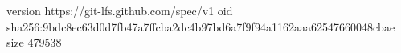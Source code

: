 version https://git-lfs.github.com/spec/v1
oid sha256:9bdc8ec63d0d7fb47a7ffcba2dc4b97bd6a7f9f94a1162aaa62547660048cbae
size 479538
